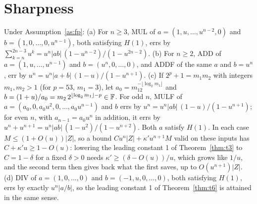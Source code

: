\section{Sharpness}

\begin{proposition}\label{prop:sharp}
Under Assumption~\ref{as:fp}: (a) For $n \ge 3$, MUL of $a = (1, u, \dots, u^{n-2}, 0)$ and $b = (1, 0, \dots, 0, u^{n-1})$, both
satisfying $H(1)$, errs by $\sum_{k=n}^{2n-3}u^k = u^n|ab|\,(1 - u^{n-2})/(1 - u^{2n-2})$. (b) For $n \ge 2$, ADD of $a
= (1, u, \dots, u^{n-1})$ and $b = (u^n, 0, \dots, 0)$, and ADDF of the same $a$ and $b = u^n$, err by $u^n = u^n|a +
b|\,(1-u)/(1-u^{n+1})$. (c) If $2^p + 1 = m_1m_2$ with integers $m_1, m_2 > 1$ (for $p = 53$,
$m_1 = 3$), let $a_0 = m_12^{-\lfloor\log_2 m_1\rfloor}$ and $b = (1+u)/a_0 = m_2\,2^{\lfloor\log_2 m_1\rfloor - p} \in \mathbb{F}$. For
odd $n$, MULF of $a = (a_0, 0, a_0u^2, 0, \dots, a_0u^{n-1})$ and $b$ errs by $u^n = u^n|ab|\,(1-u)/(1-u^{n+1})$; for
even $n$, with $a_{n-1} = a_0u^n$ in addition, it errs by $u^n + u^{n+1} = u^n|ab|\,(1-u^2)/(1-u^{n+2})$. Both $a$
satisfy $H(1)$. In each case $M \le (1+O(u))|Z|$, so a bound $C u^n|Z| + \kappa' u^{n+1}M$ valid on these inputs has
$C + \kappa' u \ge 1 - O(u)$: lowering the leading constant 1 of Theorem~\ref{thm:t3} to $C = 1 - \delta$ for a fixed
$\delta > 0$ needs $\kappa' \ge (\delta - O(u))/u$, which grows like $1/u$, and the second term then gives back what the
first saves, up to $O(u^{n+1})|Z|$. (d) DIV of $a = (1, 0, \dots, 0)$ and $b = (-1, u, 0, \dots, 0)$, both satisfying $H(1)$, errs by exactly
$u^n|a/b|$, so the leading constant 1 of Theorem~\ref{thm:t6} is attained in the same sense.
\end{proposition}

